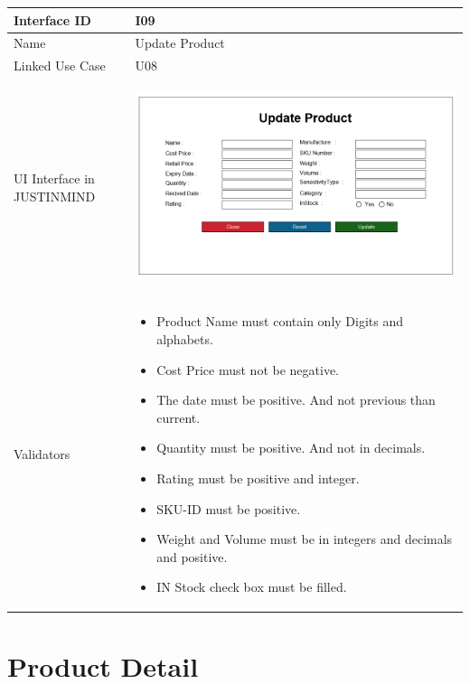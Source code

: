 \documentclass[12pt,a4paper]{report}
\begin{document}
\begin{tabular}{ | m{3cm} | m{12cm}| } \hline

Interface ID & I09  \\\hline

Name  &  Update Product \\ \hline

Linked Use Case & U08	  \\ \hline

UI Interface in JUSTINMIND & \begin{center} \includegraphics[scale=0.3]{./UIs for Latex Reports/UI-009 Update Product@1x.png}\end{center}  \\ \hline

Validators & 
\begin{itemize}
\item   Product Name must contain only Digits and alphabets.
\item Cost Price must not be negative.
\item The date must be positive. And not previous than current.
\item Quantity must be positive. And not in decimals.
\item Rating must be positive and integer.
\item SKU-ID must be positive.
\item Weight and Volume must be in integers and decimals and positive.
\item IN Stock check box must be filled.


\end{itemize}
\\ \hline

\end{tabular} 
\section{Product Detail }
\end{document}
